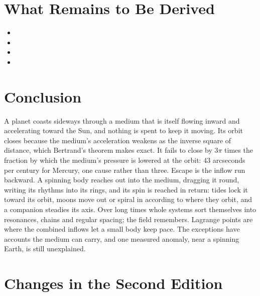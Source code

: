 \documentclass[11pt,a4paper]{article}
\begin{document}
\section{What Remains to Be Derived}
\label{sec:owed}

\begin{itemize}
\item {}
\item {}
\item {}
\item {}
\end{itemize}

\section*{Conclusion}

A planet coasts sideways through a medium that is itself flowing inward and accelerating toward the Sun, and nothing is spent to keep it moving. Its orbit closes because the medium's acceleration weakens as the inverse square of distance, which Bertrand's theorem makes exact. It fails to close by $3\pi$ times the fraction by which the medium's pressure is lowered at the orbit: 43 arcseconds per century for Mercury, one cause rather than three. Escape is the inflow run backward. A spinning body reaches out into the medium, dragging it round, writing its rhythms into its rings, and its spin is reached in return: tides lock it toward its orbit, moons move out or spiral in according to where they orbit, and a companion steadies its axis. Over long times whole systems sort themselves into resonances, chains and regular spacing; the field remembers. Lagrange points are where the combined inflows let a small body keep pace. The exceptions have accounts the medium can carry, and one measured anomaly, near a spinning Earth, is still unexplained.

\clearpage
\section*{Changes in the Second Edition}
\end{document}
